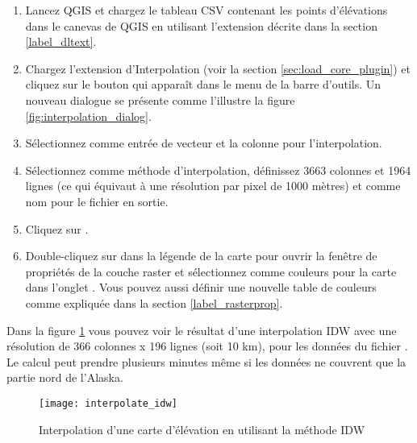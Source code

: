 \begin{enumerate}
  \item Lancez QGIS et chargez le tableau CSV  contenant les points d'élévations dans le canevas de QGIS en utilisant l'extension décrite dans la section \ref{label_dltext}. 
  \item Chargez l'extension d'Interpolation (voir la section \ref{sec:load_core_plugin}) et cliquez sur le bouton  qui apparaît dans le menu de la barre d'outils. Un nouveau dialogue se présente comme l'illustre la figure \ref{fig:interpolation_dialog}.
  \item Sélectionnez  comme entrée de vecteur et la colonne  pour l'interpolation.
  \item Sélectionnez  comme méthode d'interpolation, définissez 3663 colonnes et 1964 lignes (ce qui équivaut à une résolution par pixel de 1000 mètres) et  comme nom pour le fichier en sortie.
  \item Cliquez sur .
  \item Double-cliquez sur  dans la légende de la carte pour ouvrir la fenêtre de propriétés de la couche raster et sélectionnez  comme couleurs pour la carte dans l'onglet . Vous pouvez aussi définir une nouvelle table de couleurs comme expliquée dans la section \ref{label_rasterprop}.
\end{enumerate}

%
%

Dans la figure \ref{fig:interpolation_idw} vous pouvez voir le résultat d'une interpolation IDW avec une résolution de 366 colonnes x 196 lignes (soit 10 km), pour les données du fichier . Le calcul peut prendre plusieurs minutes même si les données ne couvrent que la partie nord de l'Alaska.

\begin{figure}[ht]
   \begin{center}
   \caption{Interpolation d'une carte d'élévation en utilisant la méthode IDW \nixcaption}\label{fig:interpolation_idw}\smallskip
   \texttt{[image: interpolate\_idw]}
\end{center}  
\end{figure}

\newpage